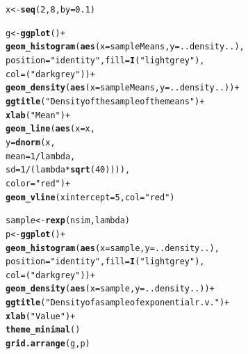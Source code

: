 \documentclass[10pt]{article}\usepackage[]{graphicx}\usepackage[]{color}
\makeatletter
\newcommand{\hlnum}[1]{\textcolor[rgb]{0.686,0.059,0.569}{#1}}%
\newcommand{\hlstr}[1]{\textcolor[rgb]{0.192,0.494,0.8}{#1}}%
\newcommand{\hlopt}[1]{\textcolor[rgb]{0,0,0}{#1}}%
\newcommand{\hlstd}[1]{\textcolor[rgb]{0.345,0.345,0.345}{#1}}%
\newcommand{\hlkwb}[1]{\textcolor[rgb]{0.69,0.353,0.396}{#1}}%
\newcommand{\hlkwc}[1]{\textcolor[rgb]{0.333,0.667,0.333}{#1}}%
\newcommand{\hlkwd}[1]{\textcolor[rgb]{0.737,0.353,0.396}{\textbf{#1}}}%
\newenvironment{kframe}{%
 \def\at@end@of@kframe{}%
 \ifinner\ifhmode%
  \def\at@end@of@kframe{\end{minipage}}%
  \begin{minipage}{\columnwidth}%
 \fi\fi%
 \def\FrameCommand##1{\hskip\@totalleftmargin \hskip-\fboxsep
 \colorbox{shadecolor}{##1}\hskip-\fboxsep
     \hskip-\linewidth \hskip-\@totalleftmargin \hskip\columnwidth}%
 \MakeFramed {\advance\hsize-\width
   \@totalleftmargin\z@ \linewidth\hsize
   \@setminipage}}%
 {\par\unskip\endMakeFramed%
 \at@end@of@kframe}
\newenvironment{knitrout}{}{} %
\makeatother
\begin{document}
\begin{knitrout}
\color{fgcolor}\begin{kframe}
\begin{alltt}
\hlstd{x} \hlkwb{<-} \hlkwd{seq}\hlstd{(}\hlnum{2}\hlstd{,}\hlnum{8}\hlstd{,}\hlkwc{by}\hlstd{=}\hlnum{0.1}\hlstd{)}

\hlstd{g}\hlkwb{<-}\hlkwd{ggplot}\hlstd{()} \hlopt{+}
\hlkwd{geom_histogram}\hlstd{(}\hlkwd{aes}\hlstd{(}\hlkwc{x}\hlstd{=sampleMeans,}\hlkwc{y}\hlstd{=..density..),}
              \hlkwc{position}\hlstd{=}\hlstr{"identity"}\hlstd{,}\hlkwc{fill}\hlstd{=}\hlkwd{I}\hlstd{(}\hlstr{"lightgrey"}\hlstd{),}
              \hlkwc{col} \hlstd{= (}\hlstr{"darkgrey"}\hlstd{))}\hlopt{+}
\hlkwd{geom_density}\hlstd{(}\hlkwd{aes}\hlstd{(}\hlkwc{x}\hlstd{=sampleMeans,}\hlkwc{y}\hlstd{=..density..))}\hlopt{+}
\hlkwd{ggtitle}\hlstd{(}\hlstr{"Density of the sample of the means"}\hlstd{)}\hlopt{+}
\hlkwd{xlab}\hlstd{(}\hlstr{"Mean"}\hlstd{)}\hlopt{+}
\hlkwd{geom_line}\hlstd{(}\hlkwd{aes}\hlstd{(}\hlkwc{x}\hlstd{=x,}
        \hlkwc{y}\hlstd{=}\hlkwd{dnorm}\hlstd{(x,}
                \hlkwc{mean} \hlstd{=} \hlnum{1}\hlopt{/}\hlstd{lambda,}
                \hlkwc{sd} \hlstd{=} \hlnum{1}\hlopt{/}\hlstd{(lambda}\hlopt{*}\hlkwd{sqrt}\hlstd{(}\hlnum{40}\hlstd{)))),}
         \hlkwc{color}\hlstd{=}\hlstr{"red"}\hlstd{)}\hlopt{+}
\hlkwd{geom_vline}\hlstd{(}\hlkwc{xintercept} \hlstd{=} \hlnum{5}\hlstd{,}\hlkwc{col} \hlstd{=} \hlstr{"red"}\hlstd{)}

\hlstd{sample}\hlkwb{<-}\hlkwd{rexp}\hlstd{(nsim,lambda)}
\hlstd{p}\hlkwb{<-}\hlkwd{ggplot}\hlstd{()}\hlopt{+}
    \hlkwd{geom_histogram}\hlstd{(}\hlkwd{aes}\hlstd{(}\hlkwc{x}\hlstd{=sample,}\hlkwc{y}\hlstd{=..density..),}
              \hlkwc{position}\hlstd{=}\hlstr{"identity"}\hlstd{,}\hlkwc{fill}\hlstd{=}\hlkwd{I}\hlstd{(}\hlstr{"lightgrey"}\hlstd{),}
              \hlkwc{col} \hlstd{= (}\hlstr{"darkgrey"}\hlstd{))}\hlopt{+}
    \hlkwd{geom_density}\hlstd{(}\hlkwd{aes}\hlstd{(}\hlkwc{x}\hlstd{=sample,}\hlkwc{y}\hlstd{=..density..))}\hlopt{+}
    \hlkwd{ggtitle}\hlstd{(}\hlstr{"Density of a sample of exponential r.v. "}\hlstd{)}\hlopt{+}
    \hlkwd{xlab}\hlstd{(}\hlstr{"Value"}\hlstd{)}\hlopt{+}
    \hlkwd{theme_minimal}\hlstd{()}
\hlkwd{grid.arrange}\hlstd{(g,p)}
\end{alltt}


{\ttfamily\noindent\itshape\color{messagecolor}{\#\# `stat\_bin()` using `bins = 30`. Pick better value with `binwidth`.\\\#\# `stat\_bin()` using `bins = 30`. Pick better value with `binwidth`.}}\end{kframe}


\end{knitrout}
\end{document}
